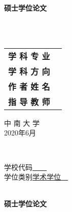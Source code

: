 \linespread{1.56}\selectfont%
\begin{titlepage}
	\thispagestyle{empty}
	
	\begin{center}
		\vspace*{6em}
		{\heiti {} \bfseries 硕士学位论文}\par
		\vspace{3.5em}
		{\heiti {}\bfseries \mytitle}\\
		\vspace{2em}
		{\bfseries\myEnlishTitle}\\
		\vspace{6em}
		{
			\begin{tabular}{>{\songti}r >{\songti}l}			
				\bfseries 学 科 专 业\quad               &\bfseries \major  \\[19pt]
				\bfseries 学 科 方 向\quad               &\bfseries \discipline  \\[19pt]
				\bfseries 作 者 姓 名\quad     &\bfseries \myName  \\ [19pt]
				\bfseries 指 导 教 师\quad               &\bfseries \mySupervisor\\ [19pt]
			\end{tabular}
		}
		
		\vspace{5em}
		{\songti {} 中 南 大 学\\ 2020年6月}	
	\end{center}
\end{titlepage}
\thispagestyle{empty}
\begin{center}
	\newlength{\ztfl}
	\begin{minipage}[t]{\ztfl}
		{\songti {} \uline{\makebox[5em][c]{\zhongtu}}}\\
		{ \uline{\makebox[5em][c]{\UDC}}}
	\end{minipage}\hfill
	\newlength{\SchoolCodeLength}
	\begin{minipage}[t]{\SchoolCodeLength}
		{\songti 学校代码\uline{~~~~\quad}}\\
		{\songti 学位类别\uline{\quad 学术学位~~}}
	\end{minipage}
	\vspace{5em}\\
	{\heiti {}\bfseries 硕士学位论文}\par
	\vspace{2em}
	{\heiti {}\bfseries \mytitle}\\
	\vspace{1em}
	{\bfseries\myEnlishTitle}
	\vspace{3em}
\end{center}
